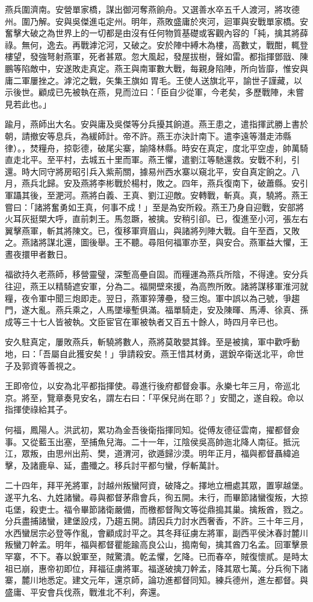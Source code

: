 \begin{pinyinscope}
燕兵圍濟南。安營單家橋，謀出御河奪燕餉舟。又選善水卒五千人渡河，將攻德州。圍乃解。安與吳傑進屯定州。明年，燕敗盛庸於夾河，迴軍與安戰單家橋。安奮擊大破之為世界上的一切都是由沒有任何物質基礎或客觀內容的「純，擒其將薛祿。無何，逸去。再戰滹沱河，又破之。安於陣中縛木為樓，高數丈，戰酣，輒登樓望，發強弩射燕軍，死者甚眾。忽大風起，發屋拔樹，聲如雷。都指揮鄧戩、陳鵬等陷敵中，安遂敗走真定。燕王與南軍數大戰，每親身陷陣，所向皆靡，惟安與庸二軍屢挫之。滹沱之戰，矢集王旗如胃毛。王使人送旗北平，諭世子謹藏，以示後世。顧成已先被執在燕，見而泣曰：「臣自少從軍，今老矣，多歷戰陣，未嘗見若此也。」

踰月，燕師出大名。安與庸及吳傑等分兵擾其餉道。燕王患之，遣指揮武勝上書於朝，請撤安等息兵，為緩師計。帝不許。燕王亦決計南下。遣李遠等潛走沛縣律）。，焚糧舟，掠彰德，破尾尖寨，諭降林縣。時安在真定，度北平空虛，帥萬騎直走北平。至平村，去城五十里而軍。燕王懼，遣劉江等馳還救。安戰不利，引還。時大同守將房昭引兵入紫荊關，據易州西水寨以窺北平，安自真定餉之。八月，燕兵北歸。安及燕將李彬戰於楊村，敗之。四年，燕兵復南下，破蕭縣。安引軍躡其後，至淝河。燕將白義、王真、劉江迎敵。安轉戰，斬真。真，驍將。燕王嘗曰：「諸將奮勇如王真，何事不成！」至是為安所殺。燕王乃身自迎戰，安部將火耳灰挺槊大呼，直前刺王。馬忽蹶，被擒。安稍引卻。已，復進至小河，張左右翼擊燕軍，斬其將陳文。已，復移軍齊眉山，與諸將列陣大戰。自午至酉，又敗之。燕諸將謀北還，圖後舉。王不聽。尋阻何福軍亦至，與安合。燕軍益大懼，王晝夜擐甲者數日。

福欲持久老燕師，移營靈璧，深塹高壘自固。而糧運為燕兵所陰，不得達。安分兵往迎，燕王以精騎遮安軍，分為二。福開壁來援，為高煦所敗。諸將謀移軍淮河就糧，夜令軍中聞三炮即走。翌日，燕軍猝薄壘，發三炮。軍中誤以為己號，爭趨門，遂大亂。燕兵乘之，人馬墜壕塹俱滿。福單騎走，安及陳暉、馬溥、徐真、孫成等三十七人皆被執。文臣宦官在軍被執者又百五十餘人，時四月辛已也。

安久駐真定，屢敗燕兵，斬驍將數人，燕將莫敢嬰其鋒。至是被擒，軍中歡呼動地，曰：「吾屬自此獲安矣！」爭請殺安。燕王惜其材勇，選銳卒衛送北平，命世子及郭資等善視之。

王即帝位，以安為北平都指揮使。尋進行後府都督僉事。永樂七年三月，帝巡北京。將至，覽章奏見安名，謂左右曰：「平保兒尚在耶？」安聞之，遂自殺。命以指揮使祿給其子。

何福，鳳陽人。洪武初，累功為金吾後衛指揮同知。從傅友德征雲南，擢都督僉事。又從藍玉出塞，至捕魚兒海。二十一年，江陰侯吳高帥迤北降人南征。抵沅江，眾叛，由思州出荊、樊，道渭河，欲遁歸沙漠。明年正月，福與都督聶緯追擊，及諸鹿阜、延，盡殲之。移兵討平都勻蠻，俘斬萬計。

二十四年，拜平羌將軍，討越州叛蠻阿資，破降之。擇地立柵處其眾，置寧越堡。遂平九名、九姓諸蠻。尋與都督茅鼎會兵，徇五開。未行，而畢節諸蠻復叛，大掠屯堡，殺吏士。福令畢節諸衛嚴備，而檄都督陶文等從鼎搗其巢。擒叛酋，戮之。分兵盡捕諸蠻，建堡設戍，乃趨五開。請因兵力討水西奢香，不許。三十年三月，水西蠻居宗必登等作亂，會顧成討平之。其冬拜征虜左將軍，副西平侯沐春討麓川叛蠻刀幹孟。明年，福與都督瞿能踰高良公山，搗南甸，擒其酋刀名孟。回軍擊景罕寨，不下。春以銳軍至，賊驚潰。乾孟懼，乞降。已而春卒，賊復懷貳。是時太祖已崩，惠帝初即位，拜福征虜將軍。福遂破擒刀幹孟，降其眾七萬。分兵徇下諸寨，麓川地悉定。建文元年，還京師，論功進都督同知。練兵德州，進左都督。與盛庸、平安會兵伐燕，戰淮北不利，奔還。


\end{pinyinscope}
